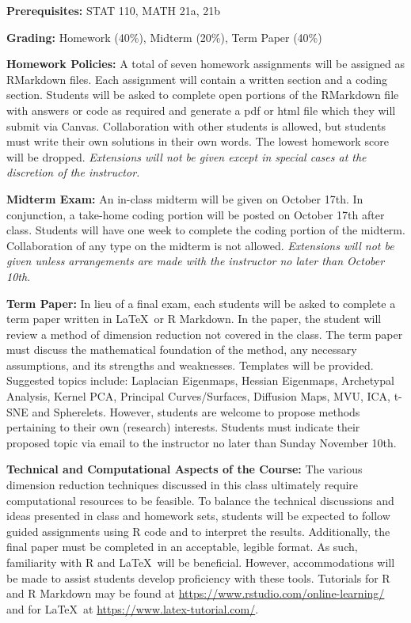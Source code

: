 \documentclass[12 point]{article}
\begin{document}
{\bf Prerequisites: } STAT 110, MATH 21a, 21b 

{\bf Grading: } Homework (40\%), Midterm (20\%), Term Paper (40\%) 

{\bf Homework Policies:} A total of seven homework assignments will be assigned as RMarkdown files. Each assignment will contain a written section and a coding section.  Students will be asked to complete open portions of the RMarkdown file with answers or code as required and generate a pdf or html file which they will submit via Canvas.  Collaboration with other students is allowed, but students must write their own solutions in their own words.  The lowest homework score will be dropped. \emph{Extensions will not be given except in special cases at the discretion of the instructor.}

{\bf Midterm Exam:} An in-class midterm will be given on October 17th.  In conjunction, a take-home coding portion will be posted on October 17th after class.  Students will have one week to complete the coding portion of the midterm.  Collaboration of any type on the midterm is not allowed. \emph{Extensions will not be given unless arrangements are made with the instructor no later than October 10th.  }

{\bf Term Paper:} In lieu of a final exam, each students will be asked to complete a term paper written in \LaTeX\, or R Markdown. In the paper, the student will review a method of dimension reduction not covered in the class.  The term paper must discuss the mathematical foundation of the method, any necessary assumptions, and its strengths and weaknesses.  Templates will be provided. Suggested topics include: Laplacian Eigenmaps, Hessian Eigenmaps, Archetypal Analysis, Kernel PCA, Principal Curves/Surfaces, Diffusion Maps, MVU, ICA, t-SNE and Spherelets. However, students are welcome to propose methods pertaining to their own (research) interests.   Students must indicate their proposed topic via email to the instructor no later than Sunday November 10th.  


{\bf Technical and Computational Aspects of the Course:} The various dimension reduction techniques discussed in this class ultimately require computational resources to be feasible.  To balance the technical discussions and ideas presented in class and homework sets, students will be expected to follow guided assignments using R code and to interpret the results.  Additionally, the final paper must be completed in an acceptable, legible format.  As such, familiarity with R and \LaTeX\, will be beneficial.  However, accommodations will be made to assist students develop proficiency with these tools.  Tutorials for R and R Markdown may be found at \href{https://www.rstudio.com/online-learning/}{https://www.rstudio.com/online-learning/} and for \LaTeX\, at \href{https://www.latex-tutorial.com/}{https://www.latex-tutorial.com/}. 
\end{document}
